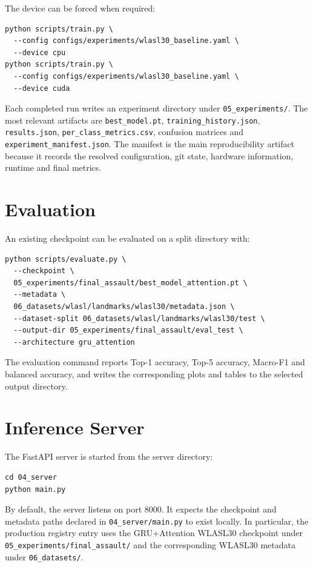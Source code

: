 The device can be forced when required:

\begin{verbatim}
python scripts/train.py \
  --config configs/experiments/wlasl30_baseline.yaml \
  --device cpu
python scripts/train.py \
  --config configs/experiments/wlasl30_baseline.yaml \
  --device cuda
\end{verbatim}

Each completed run writes an experiment directory under \texttt{05\_experiments/}. The most
relevant artifacts are \texttt{best\_model.pt}, \texttt{training\_history.json},
\texttt{results.json}, \texttt{per\_class\_metrics.csv}, confusion matrices and
\texttt{experiment\_manifest.json}. The manifest is the main reproducibility artifact because it
records the resolved configuration, git state, hardware information, runtime and final metrics.

\section{Evaluation}
\label{app:user_manual_evaluation}

An existing checkpoint can be evaluated on a split directory with:

\begin{verbatim}
python scripts/evaluate.py \
  --checkpoint \
  05_experiments/final_assault/best_model_attention.pt \
  --metadata \
  06_datasets/wlasl/landmarks/wlasl30/metadata.json \
  --dataset-split 06_datasets/wlasl/landmarks/wlasl30/test \
  --output-dir 05_experiments/final_assault/eval_test \
  --architecture gru_attention
\end{verbatim}

The evaluation command reports Top-1 accuracy, Top-5 accuracy, Macro-F1 and balanced accuracy, and
writes the corresponding plots and tables to the selected output directory.

\section{Inference Server}
\label{app:user_manual_server}

The FastAPI server is started from the server directory:

\begin{verbatim}
cd 04_server
python main.py
\end{verbatim}

By default, the server listens on port 8000. It expects the checkpoint and metadata paths declared
in \texttt{04\_server/main.py} to exist locally. In particular, the production registry entry uses
the GRU+Attention WLASL30 checkpoint under \texttt{05\_experiments/final\_assault/} and the
corresponding WLASL30 metadata under \texttt{06\_datasets/}.

